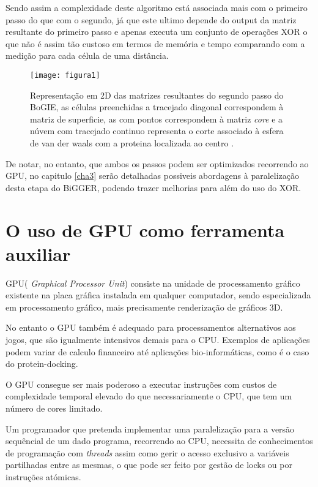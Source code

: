 Sendo assim  a complexidade deste algoritmo está associada mais com o primeiro passo do que com o segundo, já que este ultimo depende do output da matriz resultante do primeiro passo e apenas executa um conjunto de operações XOR o que não é assim tão custoso em termos de memória e tempo comparando com a medição para cada célula de uma distância.

\begin{figure}[ht]
  \centering
    {\texttt{[image: figura1]}}
  \caption{Representação em 2D das matrizes resultantes do segundo passo do BoGIE, as células preenchidas a tracejado diagonal correspondem à matriz de superficie, as com pontos correspondem à matriz \textit{core} e a núvem com tracejado continuo representa o corte associado à esfera de van der waals com a proteina localizada ao centro \cite{biggerPaper}.}
  \label{fig:fig2subfig}
\end{figure}

De notar, no entanto, que ambos os passos podem ser optimizados recorrendo ao GPU, no capitulo \ref{cha3} serão detalhadas possiveis abordagens à paralelização desta etapa do BiGGER, podendo trazer melhorias para além do uso do XOR.


\section{ O uso de GPU como ferramenta auxiliar}
\label{gpus}
GPU( \textit{Graphical Processor Unit}) consiste na unidade de processamento gráfico existente na placa gráfica instalada em qualquer computador, sendo especializada em processamento gráfico, mais precisamente renderização de gráficos 3D. 

 No entanto o GPU também é adequado para processamentos alternativos aos jogos, que são igualmente intensivos demais para o CPU. Exemplos de aplicações podem variar de calculo financeiro até aplicações bio-informáticas, como é o caso do protein-docking.
 
O GPU consegue ser mais poderoso a executar instruções com custos de complexidade temporal elevado do que necessariamente o CPU, que tem um número de cores limitado. \cite{nvidia2011nvidia}

 Um programador que  pretenda implementar uma paralelização para a versão sequêncial de um dado programa, recorrendo ao CPU, necessita de conhecimentos de programação com \textit{threads} assim como gerir o acesso exclusivo a variáveis partilhadas entre as mesmas, o que pode ser feito por gestão de locks ou por instruções atómicas. 
 

